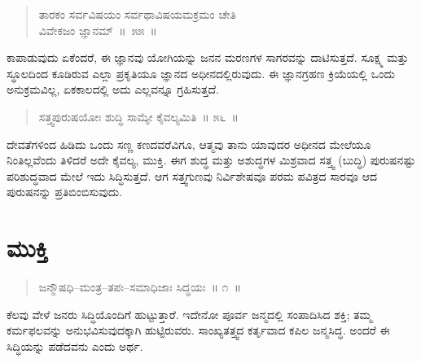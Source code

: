 \vspace{-0.3cm}

\begin{verse}
ತಾರಕಂ ಸರ್ವವಿಷಯಂ ಸರ್ವಥಾವಿಷಯಮಕ್ರಮಂ ಚೇತಿ\\
 ವಿವೇಕಜಂ ಜ್ಞಾನಮ್​~\hfill{॥~೫೫~॥}
\end{verse}

\vspace{-0.3cm}


ಕಾಪಾಡುವುದು ಏಕೆಂದರೆ, ಈ ಜ್ಞಾನವು ಯೋಗಿಯನ್ನು ಜನನ ಮರಣಗಳ ಸಾಗರವನ್ನು ದಾಟಿಸುತ್ತದೆ. ಸೂಕ್ಷ್ಮ ಮತ್ತು ಸ್ಥೂಲದಿಂದ ಕೂಡಿರುವ ಎಲ್ಲಾ ಪ್ರಕೃತಿಯೂ ಜ್ಞಾನದ ಅಧೀನದಲ್ಲಿರುವುದು. ಈ ಜ್ಞಾನಗ್ರಹಣ ಕ್ರಿಯೆಯಲ್ಲಿ ಒಂದು ಅನುಕ್ರಮವಿಲ್ಲ, ಏಕಕಾಲದಲ್ಲಿ ಅದು ಎಲ್ಲವನ್ನೂ ಗ್ರಹಿಸುತ್ತದೆ. 

\vspace{-0.3cm}

\begin{verse}
ಸತ್ತ್ವಪುರುಷಯೋಃ ಶುದ್ಧಿ ಸಾಮ್ಯೇ ಕೈವಲ್ಯಮಿತಿ~॥ ೫೬~॥
\end{verse}

\vspace{-0.3cm}


ದೇವತೆಗಳಿಂದ ಹಿಡಿದು ಒಂದು ಸಣ್ಣ ಕಣದವರೆವಿಗೂ, ಆತ್ಮವು ತಾನು ಯಾವುದರ ಅಧೀನದ ಮೇಲೆಯೂ ನಿಂತಿಲ್ಲವೆಂದು ತಿಳಿದರೆ ಅದೇ ಕೈವಲ್ಯ, ಮುಕ್ತಿ. ಈಗ ಶುದ್ಧ ಮತ್ತು ಅಶುದ್ಧಗಳ ಮಿಶ್ರವಾದ ಸತ್ತ್ವ (ಬುದ್ಧಿ) ಪುರುಷನಷ್ಟು ಪರಿಶುದ್ಧವಾದ ಮೇಲೆ ಇದು ಸಿದ್ಧಿಸುತ್ತದೆ. ಆಗ ಸತ್ತ್ವಗುಣವು ನಿರ್ವಿಶೇಷವೂ ಪರಮ ಪವಿತ್ರದ ಸಾರವೂ ಆದ ಪುರುಷನನ್ನು ಪ್ರತಿಬಿಂಬಿಸುವುದು.

\chapter{ಮುಕ್ತಿ}

\begin{verse}
ಜನ್ಮೌಷಧಿ–ಮಂತ್ರ–ತಪಃ–ಸಮಾಧಿಜಾಃ ಸಿದ್ಧಯಃ~॥ ೧~॥
\end{verse}

\vspace{-0.4cm}


ಕೆಲವು ವೇಳೆ ಜನರು ಸಿದ್ಧಿಯೊಂದಿಗೆ ಹುಟ್ಟುತ್ತಾರೆ. ಇದೇನೋ ಪೂರ್ವ ಜನ್ಮದಲ್ಲಿ ಸಂಪಾದಿಸಿದ ಶಕ್ತಿ; ತಮ್ಮ ಕರ್ಮಫಲವನ್ನು ಅನುಭವಿಸುವುದಕ್ಕಾಗಿ ಹುಟ್ಟಿರುವರು. ಸಾಂಖ್ಯತತ್ತ್ವದ ಕರ್ತೃವಾದ ಕಪಿಲ ಜನ್ಮಸಿದ್ಧ. ಅಂದರೆ ಈ ಸಿದ್ಧಿಯನ್ನು ಪಡೆದವನು ಎಂದು ಅರ್ಥ. 

